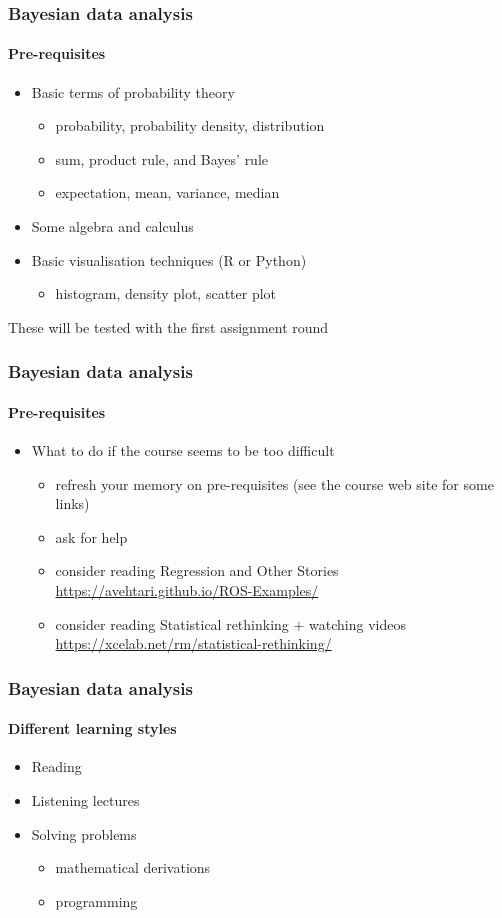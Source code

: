 \documentclass[english]{beamer}
\begin{document}
\begin{frame}
  \frametitle{Bayesian data analysis}  %
  \framesubtitle{Pre-requisites}
  \begin{itemize}
  \item Basic terms of probability theory
    \begin{itemize}
    \item probability, probability density, distribution
    \item sum, product rule, and Bayes' rule
    \item expectation, mean, variance, median
    \end{itemize}
  \item Some algebra and calculus
  \item Basic visualisation techniques (R or Python)
    \begin{itemize}
    \item histogram, density plot, scatter plot
    \end{itemize}
  \end{itemize}

  These will be tested with the first assignment round

\end{frame}

\begin{frame}
  \frametitle{Bayesian data analysis}  %
  \framesubtitle{Pre-requisites}
  \begin{itemize}
  \item What to do if the course seems to be too difficult
    \begin{itemize}
    \item refresh your memory on pre-requisites (see the course web
      site for some links)
    \item ask for help
    \item consider reading Regression and Other Stories \url{https://avehtari.github.io/ROS-Examples/}
    \item consider reading Statistical rethinking + watching videos \url{https://xcelab.net/rm/statistical-rethinking/}
    \end{itemize}
  \end{itemize}

\end{frame}


\begin{frame}
  \frametitle{Bayesian data analysis}  %
  \framesubtitle{Different learning styles}

  \begin{itemize}
  \item Reading
  \item Listening lectures
  \item Solving problems
    \begin{itemize}
    \item mathematical derivations
    \item programming
    \end{itemize}
  \end{itemize}
  
\end{frame}
\end{document}
